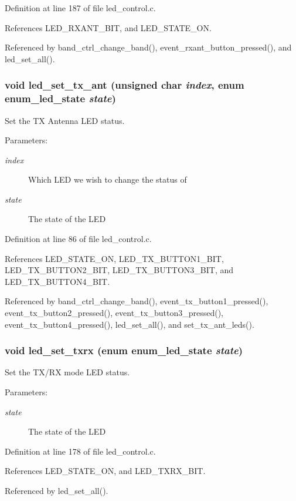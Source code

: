 Definition at line 187 of file led\_\-control.c.

References LED\_\-RXANT\_\-BIT, and LED\_\-STATE\_\-ON.

Referenced by band\_\-ctrl\_\-change\_\-band(), event\_\-rxant\_\-button\_\-pressed(), and led\_\-set\_\-all().
\subsubsection[{led\_\-set\_\-tx\_\-ant}]{\setlength{\rightskip}{0pt plus 5cm}void led\_\-set\_\-tx\_\-ant (unsigned char {\em index}, \/  enum {\bf enum\_\-led\_\-state} {\em state})}\label{led__control_8c_66d6c83ed387c751253fe06a14ee842f}


Set the TX Antenna LED status. 

\begin{Desc}
\item[Parameters:]
\begin{description}
\item[{\em index}]Which LED we wish to change the status of \item[{\em state}]The state of the LED \end{description}
\end{Desc}


Definition at line 86 of file led\_\-control.c.

References LED\_\-STATE\_\-ON, LED\_\-TX\_\-BUTTON1\_\-BIT, LED\_\-TX\_\-BUTTON2\_\-BIT, LED\_\-TX\_\-BUTTON3\_\-BIT, and LED\_\-TX\_\-BUTTON4\_\-BIT.

Referenced by band\_\-ctrl\_\-change\_\-band(), event\_\-tx\_\-button1\_\-pressed(), event\_\-tx\_\-button2\_\-pressed(), event\_\-tx\_\-button3\_\-pressed(), event\_\-tx\_\-button4\_\-pressed(), led\_\-set\_\-all(), and set\_\-tx\_\-ant\_\-leds().
\subsubsection[{led\_\-set\_\-txrx}]{\setlength{\rightskip}{0pt plus 5cm}void led\_\-set\_\-txrx (enum {\bf enum\_\-led\_\-state} {\em state})}\label{led__control_8c_7cfa42017a78de6f6b9eb9ec790b8261}


Set the TX/RX mode LED status. 

\begin{Desc}
\item[Parameters:]
\begin{description}
\item[{\em state}]The state of the LED \end{description}
\end{Desc}


Definition at line 178 of file led\_\-control.c.

References LED\_\-STATE\_\-ON, and LED\_\-TXRX\_\-BIT.

Referenced by led\_\-set\_\-all().